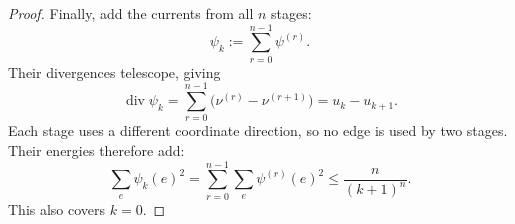 \documentclass[conference]{IEEEtran}
\DeclareRobustCommand{\revtwoadd}[1]{{\color{revisionmaroon}#1}}
\newtheorem{proposition}{Proposition}
\begin{document}
\begin{proof}
Finally, add the currents from all $n$ stages:
\[
\psi_k:=\sum_{r=0}^{n-1}\psi^{(r)}.
\]
Their divergences telescope, giving
\[
\operatorname{div}\psi_k
=\sum_{r=0}^{n-1}
  \bigl(\nu^{(r)}-\nu^{(r+1)}\bigr)
=u_k-u_{k+1}.
\]
Each stage uses a different coordinate direction, so no edge is
used by two stages. Their energies therefore add:
\[
\sum_e\psi_k(e)^2
=\sum_{r=0}^{n-1}\sum_e\psi^{(r)}(e)^2
\le \frac{n}{(k+1)^n}.
\]
This also covers $k=0$.
\end{proof}














\end{document}
